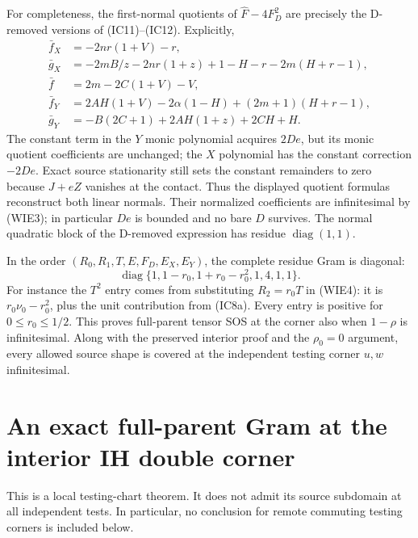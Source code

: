 For completeness, the first-normal quotients of
$\widehat F-4F_D^2$ are precisely the D-removed versions of
(IC11)--(IC12). Explicitly,
\begin{align*}
 \bar f_X&=-2nr(1+V)-r,\\
 \bar g_X&=-2mB/z-2nr(1+z)+1-H-r-2m(H+r-1),\\
 \bar f&=2m-2C(1+V)-V,\\
 \bar f_Y&=2AH(1+V)-2\alpha(1-H)+(2m+1)(H+r-1),\\
 \bar g_Y&=-B(2C+1)+2AH(1+z)+2CH+H.
\end{align*}
The constant term in the $Y$ monic polynomial acquires $2De$, but
its monic quotient coefficients are unchanged; the $X$ polynomial
has the constant correction $-2De$. Exact source stationarity
still sets the constant remainders to zero because $J+eZ$ vanishes
at the contact. Thus the displayed quotient formulas reconstruct
both linear normals. Their normalized coefficients are infinitesimal
by (WIE3); in particular $De$ is bounded and no bare $D$ survives.
The normal quadratic block of the D-removed expression has residue
$\operatorname{diag}(1,1)$.

In the order $(R_0,R_1,T,E,F_D,E_X,E_Y)$, the complete residue Gram
is diagonal:
\[
 \operatorname{diag}\{1,1-r_0,1+r_0-r_0^2,1,4,1,1\}.
\tag{WIE6}
\]
For instance the $T^2$ entry comes from substituting $R_2=r_0T$
in (WIE4): it is $r_0\nu_0-r_0^2$, plus the unit contribution from
(IC8a). Every entry is positive for $0\le r_0\le1/2$.
This proves full-parent tensor SOS at the corner also when
$1-\rho$ is infinitesimal. Along with the preserved interior proof
and the $\rho_0=0$ argument, every allowed source shape is covered
at the independent testing corner $u,w$ infinitesimal.


\section{\texorpdfstring{An exact full-parent Gram at the interior IH double corner}{An exact full-parent Gram at the interior IH double corner}}
\label{component:pc00b84929b12}

\label{pc00b84929b12:sec:c2-weak-ih-interior-corner}

This is a local testing-chart theorem. It does not admit its source
subdomain at all independent tests. In particular, no conclusion for
remote commuting testing corners is included below.

